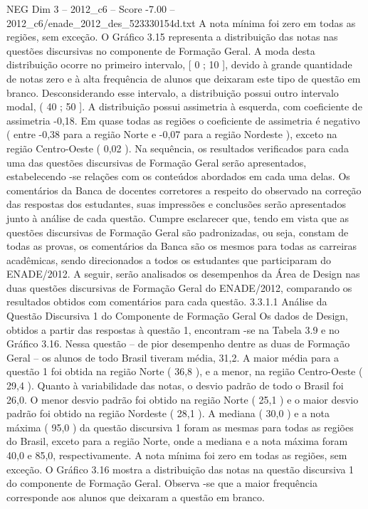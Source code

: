 \begin{textsample}{NEG Dim 3 – 2012\_c6 – Score -7.00 – 2012\_c6/enade\_2012\_des\_523330154d.txt}
A nota mínima foi zero em todas as regiões, sem exceção.
O Gráfico 3.15 representa a distribuição das notas nas questões discursivas no componente de Formação Geral.
A moda desta distribuição ocorre no primeiro intervalo, [ 0 ; 10 ], devido à grande quantidade de notas zero e à alta frequência de alunos que deixaram este tipo de questão em branco.
Desconsiderando esse intervalo, a distribuição possui outro intervalo modal, ( 40 ; 50 ].
A distribuição possui assimetria à esquerda, com coeficiente de assimetria -0,18.
Em quase todas as regiões o coeficiente de assimetria é negativo ( entre -0,38 para a região Norte e -0,07 para a região Nordeste ), exceto na região Centro-Oeste ( 0,02 ).
Na sequência, os resultados verificados para cada uma das questões discursivas de Formação Geral serão apresentados, estabelecendo -se relações com os conteúdos abordados em cada uma delas.
Os comentários da Banca de docentes corretores a respeito do observado na correção das respostas dos estudantes, suas impressões e conclusões serão apresentados junto à análise de cada questão.
Cumpre esclarecer que, tendo em vista que as questões discursivas de Formação Geral são padronizadas, ou seja, constam de todas as provas, os comentários da Banca são os mesmos para todas as carreiras acadêmicas, sendo direcionados a todos os estudantes que participaram do ENADE/2012.
A seguir, serão analisados os desempenhos da Área de Design nas duas questões discursivas de Formação Geral do ENADE/2012, comparando os resultados obtidos com comentários para cada questão. 3.3.1.1 Análise da Questão Discursiva 1 do Componente de Formação Geral Os dados de Design, obtidos a partir das respostas à questão 1, encontram -se na Tabela 3.9 e no Gráfico 3.16.
Nessa questão – de pior desempenho dentre as duas de Formação Geral – os alunos de todo Brasil tiveram média, 31,2.
A maior média para a questão 1 foi obtida na região Norte ( 36,8 ), e a menor, na região Centro-Oeste ( 29,4 ).
Quanto à variabilidade das notas, o desvio padrão de todo o Brasil foi 26,0.
O menor desvio padrão foi obtido na região Norte ( 25,1 ) e o maior desvio padrão foi obtido na região Nordeste ( 28,1 ).
A mediana ( 30,0 ) e a nota máxima ( 95,0 ) da questão discursiva 1 foram as mesmas para todas as regiões do Brasil, exceto para a região Norte, onde a mediana e a nota máxima foram 40,0 e 85,0, respectivamente.
A nota mínima foi zero em todas as regiões, sem exceção.
O Gráfico 3.16 mostra a distribuição das notas na questão discursiva 1 do componente de Formação Geral.
Observa -se que a maior frequência corresponde aos alunos que deixaram a questão em branco.

\end{textsample}
